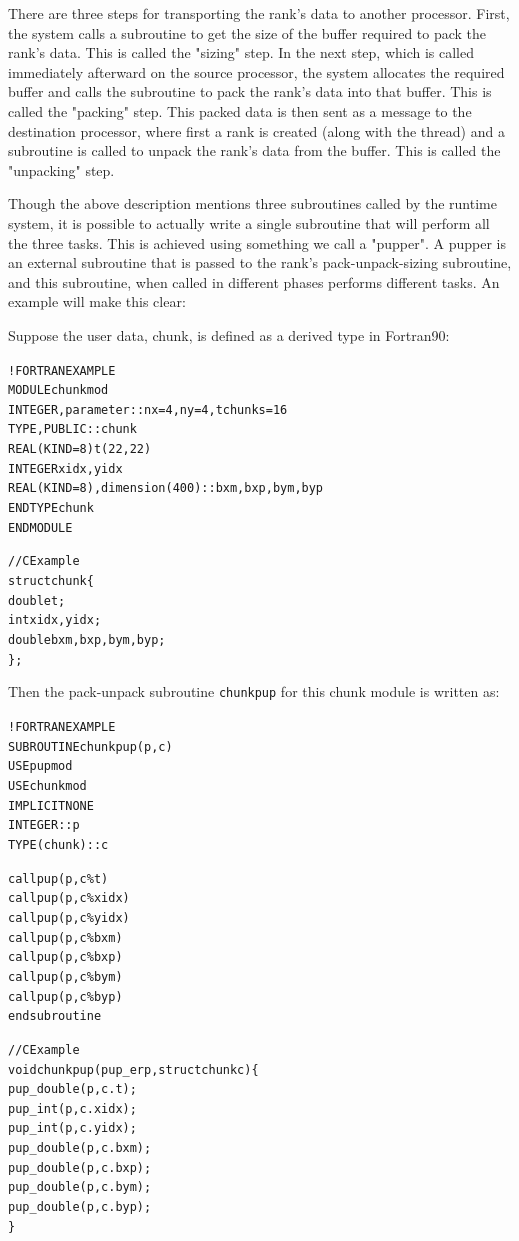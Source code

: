\documentclass[10pt]{article}
\begin{document}
There are three steps for transporting the rank's data to another processor.
First, the system calls a subroutine to get the size of the buffer required to
pack the rank's data. This is called the "sizing" step. In the next step,
which is called immediately afterward on the source processor, the system
allocates the required buffer and calls the subroutine to pack the rank's data
into that buffer. This is called the "packing" step. This packed data is then
sent as a message to the destination processor, where first a rank is created
(along with the thread) and a subroutine is called to unpack the rank's data
from the buffer. This is called the "unpacking" step.

Though the above description mentions three subroutines called by the \ampi{}
runtime system, it is possible to actually write a single subroutine that will
perform all the three tasks. This is achieved using something we call a
"pupper". A pupper is an external subroutine that is passed to the rank's
pack-unpack-sizing subroutine, and this subroutine, when called in different
phases performs different tasks. An example will make this clear:

Suppose the user data, chunk, is defined as a derived type in Fortran90:

\begin{alltt}
!FORTRAN EXAMPLE
MODULE chunkmod
  INTEGER, parameter :: nx=4, ny=4, tchunks=16
  TYPE, PUBLIC :: chunk
      REAL(KIND=8) t(22,22)
      INTEGER xidx, yidx
      REAL(KIND=8), dimension(400):: bxm, bxp, bym, byp
  END TYPE chunk
END MODULE

//C Example
struct chunk\{
  double t;
  int xidx, yidx;
  double bxm,bxp,bym,byp;
\};
\end{alltt}

Then the pack-unpack subroutine \texttt{chunkpup} for this chunk module is
written as:

\begin{alltt}
!FORTRAN EXAMPLE
SUBROUTINE chunkpup(p, c)
  USE pupmod
  USE chunkmod
  IMPLICIT NONE
  INTEGER :: p
  TYPE(chunk) :: c

  call pup(p, c\%t)
  call pup(p, c\%xidx)
  call pup(p, c\%yidx)
  call pup(p, c\%bxm)
  call pup(p, c\%bxp)
  call pup(p, c\%bym)
  call pup(p, c\%byp)
end subroutine

//C Example
void chunkpup(pup_er p, struct chunk c)\{
  pup_double(p,c.t);
  pup_int(p,c.xidx);
  pup_int(p,c.yidx);
  pup_double(p,c.bxm);
  pup_double(p,c.bxp);
  pup_double(p,c.bym);
  pup_double(p,c.byp);
\}
\end{alltt}
\end{document}

